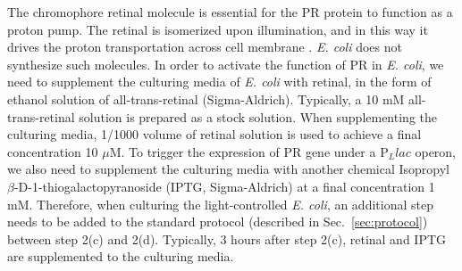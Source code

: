 The chromophore retinal molecule is essential for the PR protein to function as a proton pump. The retinal is isomerized upon illumination, and in this way it drives the proton transportation across cell membrane \cite{Subramaniam2000}. \textit{E. coli} does not synthesize such molecules. In order to activate the function of PR in \textit{E. coli}, we need to supplement the culturing media of \textit{E. coli} with retinal, in the form of ethanol solution of all-trans-retinal (Sigma-Aldrich). Typically, a 10 mM all-trans-retinal solution is prepared as a stock solution. When supplementing the culturing media, 1/1000 volume of retinal solution is used to achieve a final concentration 10 $\mu$M. To trigger the expression of PR gene under a P$_Llac$ operon, we also need to supplement the culturing media with another chemical Isopropyl $\beta$-D-1-thiogalactopyranoside (IPTG, Sigma-Aldrich) at a final concentration 1 mM. Therefore, when culturing the light-controlled \textit{E. coli}, an additional step needs to be added to the standard protocol (described in Sec.~\ref{sec:protocol}) between step 2(c) and 2(d). Typically, 3 hours after step 2(c), retinal and IPTG are supplemented to the culturing media.

